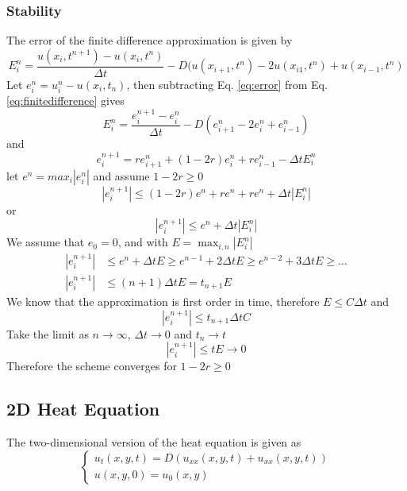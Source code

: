 \documentclass[11pt,a4paper,noindent]{article}
\begin{document}
\subsubsection{Stability}
The error of the finite difference approximation is given by
\begin{equation} \label{eq:error}
E_i^n = \frac{u(x_i,t^{n+1})-u(x_i,t^{n})}{\Delta t} - D (u(x_{i+1},t^{n}) - 2u(x_{i1},t^{n}) + u(x_{i-1},t^{n})
\end{equation}
Let $e_i^n = u_i^n - u(x_i,t_{n})$, then subtracting Eq. \ref{eq:error} from Eq. \ref{eq:finitedifference} gives
\begin{equation}
E_i^n = \frac{e^{n+1}_i-e^{n}_i}{\Delta t} - D (e^n_{i+1} - 2e^n_{i} + e^n_{i-1})
\end{equation}
and
\begin{equation}
e^{n+1}_i = r e^n_{i+1} + (1-2r)e^n_{i} + r e^n_{i-1} - \Delta t E_i^n
\end{equation}
let $e^n = max_i|e_i^n|$ and assume $1-2r\geq 0$
\begin{equation}
|e_i^{n+1}| \leq (1-2r)e^n + re^n + re^n + \Delta t |E_i^n|
\end{equation}
or
\begin{equation}
|e_i^{n+1}| \leq e^n + \Delta t |E_i^n|
\end{equation}
We assume that $e_0=0$, and with $E = \max_{i,n}|E_i^n|$
\begin{align}
|e_i^{n+1}| &\leq e^n + \Delta t E \geq e^{n-1} + 2\Delta t E \geq e^{n-2} + 3\Delta t E \geq \ldots \\
|e_i^{n+1}| &\leq (n+1)\Delta t E = t_{n+1} E
\end{align}
We know that the approximation is first order in time, therefore $E \leq C \Delta t$ and
\begin{equation}
|e_i^{n+1}| \leq t_{n+1}\Delta t C
\end{equation}
Take the limit as $n \rightarrow \infty$, $\Delta t \rightarrow 0$ and $t_n \rightarrow t$
\begin{equation}
|e_i^{n+1}| \leq t E \rightarrow 0
\end{equation}
Therefore the scheme converges for $1-2r\geq 0$

\subsection{2D Heat Equation}
The two-dimensional version of the heat equation is given as
\begin{equation}\label{eq:diffusion2}
\left\lbrace \begin{array}{c}
u_t(x,y,t) = D (u_{xx}(x,y,t) + u_{xx}(x,y,t)) \\
u(x,y,0) = u_0(x,y)
\end{array}
\right.
\end{equation}
\end{document}
